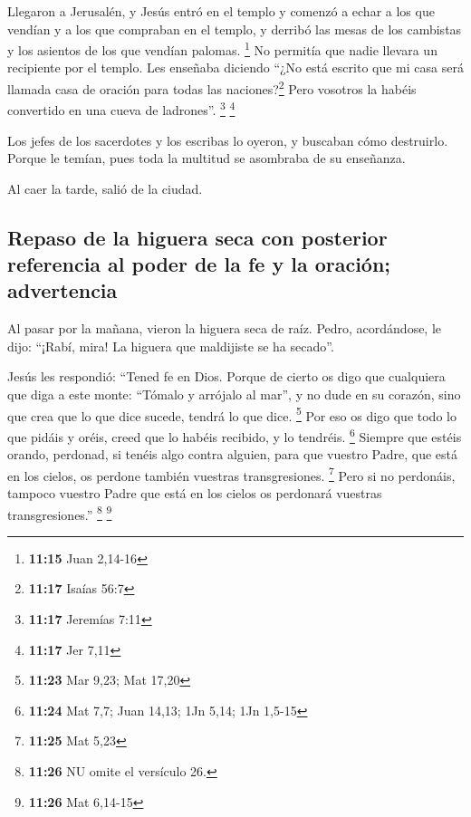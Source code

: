  Llegaron a Jerusalén, y Jesús entró en el templo y
comenzó a echar a los que vendían y a los que compraban en el templo, y
derribó las mesas de los cambistas y los asientos de los que vendían
palomas. \footnote{\textbf{11:15} Juan 2,14-16}  No
permitía que nadie llevara un recipiente por el templo. 
Les enseñaba diciendo ``¿No está escrito que mi casa será llamada casa
de oración para todas las naciones?\footnote{\textbf{11:17} Isaías 56:7}
Pero vosotros la habéis convertido en una cueva de ladrones''.
\footnote{\textbf{11:17} Jeremías 7:11} \footnote{\textbf{11:17} Jer
  7,11}

 Los jefes de los sacerdotes y los escribas lo oyeron, y
buscaban cómo destruirlo. Porque le temían, pues toda la multitud se
asombraba de su enseñanza.

 Al caer la tarde, salió de la ciudad.

\hypertarget{repaso-de-la-higuera-seca-con-posterior-referencia-al-poder-de-la-fe-y-la-oraciuxf3n-advertencia}{%
\subsection{Repaso de la higuera seca con posterior referencia al poder
de la fe y la oración;
advertencia}\label{repaso-de-la-higuera-seca-con-posterior-referencia-al-poder-de-la-fe-y-la-oraciuxf3n-advertencia}}

 Al pasar por la mañana, vieron la higuera seca de raíz.
 Pedro, acordándose, le dijo: ``¡Rabí, mira! La higuera
que maldijiste se ha secado''.

 Jesús les respondió: ``Tened fe en Dios. 
Porque de cierto os digo que cualquiera que diga a este monte: ``Tómalo
y arrójalo al mar'', y no dude en su corazón, sino que crea que lo que
dice sucede, tendrá lo que dice. \footnote{\textbf{11:23} Mar 9,23; Mat
  17,20}  Por eso os digo que todo lo que pidáis y oréis,
creed que lo habéis recibido, y lo tendréis. \footnote{\textbf{11:24}
  Mat 7,7; Juan 14,13; 1Jn 5,14; 1Jn 1,5-15}  Siempre que
estéis orando, perdonad, si tenéis algo contra alguien, para que vuestro
Padre, que está en los cielos, os perdone también vuestras
transgresiones. \footnote{\textbf{11:25} Mat 5,23}  Pero
si no perdonáis, tampoco vuestro Padre que está en los cielos os
perdonará vuestras transgresiones.'' \footnote{\textbf{11:26} NU omite
  el versículo 26.} \footnote{\textbf{11:26} Mat 6,14-15}

